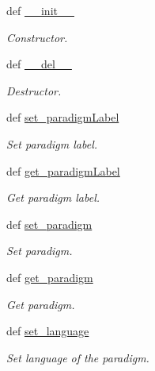 \begin{DoxyCompactItemize}
\item 
def \hyperlink{classlmf_1_1src_1_1morphosyntax_1_1paradigm_1_1_paradigm_ab0c529b6dfdc802436aaee80cc7a3f1a}{\+\_\+\+\_\+init\+\_\+\+\_\+}
\begin{DoxyCompactList}\small\item\em Constructor. \end{DoxyCompactList}\item 
def \hyperlink{classlmf_1_1src_1_1morphosyntax_1_1paradigm_1_1_paradigm_a27ffcc1bdb76712e7d8b31de78412f8a}{\+\_\+\+\_\+del\+\_\+\+\_\+}
\begin{DoxyCompactList}\small\item\em Destructor. \end{DoxyCompactList}\item 
def \hyperlink{classlmf_1_1src_1_1morphosyntax_1_1paradigm_1_1_paradigm_abe500cbb370628c4945b6433124f0f05}{set\+\_\+paradigm\+Label}
\begin{DoxyCompactList}\small\item\em Set paradigm label. \end{DoxyCompactList}\item 
def \hyperlink{classlmf_1_1src_1_1morphosyntax_1_1paradigm_1_1_paradigm_ab90570fe38c57469e05359af8806c017}{get\+\_\+paradigm\+Label}
\begin{DoxyCompactList}\small\item\em Get paradigm label. \end{DoxyCompactList}\item 
def \hyperlink{classlmf_1_1src_1_1morphosyntax_1_1paradigm_1_1_paradigm_a31c24b8f0fdbf375a4a64f8c37a74825}{set\+\_\+paradigm}
\begin{DoxyCompactList}\small\item\em Set paradigm. \end{DoxyCompactList}\item 
def \hyperlink{classlmf_1_1src_1_1morphosyntax_1_1paradigm_1_1_paradigm_afe61d3e21fd13270af987b702304b449}{get\+\_\+paradigm}
\begin{DoxyCompactList}\small\item\em Get paradigm. \end{DoxyCompactList}\item 
def \hyperlink{classlmf_1_1src_1_1morphosyntax_1_1paradigm_1_1_paradigm_a142b0411391ae7842710e1e086420a40}{set\+\_\+language}
\begin{DoxyCompactList}\small\item\em Set language of the paradigm. \end{DoxyCompactList}\item 

\end{DoxyCompactItemize}
